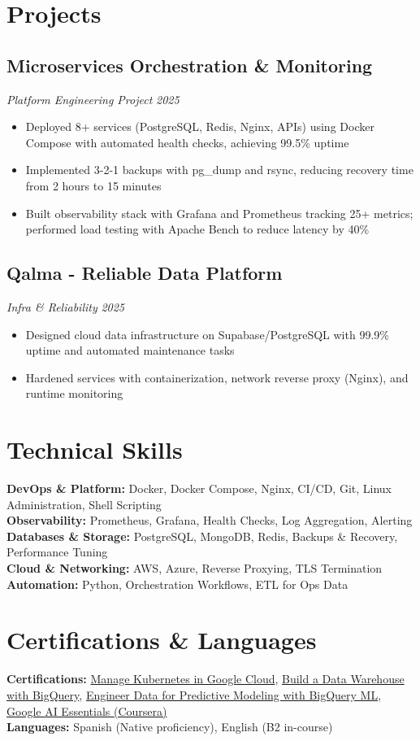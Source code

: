 \documentclass[7.5pt,a4paper]{article}
\newcommand{\project}[3]{\subsection*{#1}\textit{#2} \hfill \textit{#3}}
\begin{document}
\section*{Projects}

\project{Microservices Orchestration \& Monitoring}{Platform Engineering Project}{2025}
\begin{itemize}
\item Deployed 8+ services (PostgreSQL, Redis, Nginx, APIs) using Docker Compose with automated health checks, achieving 99.5\% uptime
\item Implemented 3-2-1 backups with pg\_dump and rsync, reducing recovery time from 2 hours to 15 minutes
\item Built observability stack with Grafana and Prometheus tracking 25+ metrics; performed load testing with Apache Bench to reduce latency by 40\%
\end{itemize}

\project{Qalma - Reliable Data Platform}{Infra \& Reliability}{2025}
\begin{itemize}
\item Designed cloud data infrastructure on Supabase/PostgreSQL with 99.9\% uptime and automated maintenance tasks
\item Hardened services with containerization, network reverse proxy (Nginx), and runtime monitoring
\end{itemize}

\section*{Technical Skills}
\textbf{DevOps \& Platform:} Docker, Docker Compose, Nginx, CI/CD, Git, Linux Administration, Shell Scripting \\
\textbf{Observability:} Prometheus, Grafana, Health Checks, Log Aggregation, Alerting \\
\textbf{Databases \& Storage:} PostgreSQL, MongoDB, Redis, Backups \& Recovery, Performance Tuning \\
\textbf{Cloud \& Networking:} AWS, Azure, Reverse Proxying, TLS Termination \\
\textbf{Automation:} Python, Orchestration Workflows, ETL for Ops Data

\section*{Certifications \& Languages}
\textbf{Certifications:} \href{https://www.credly.com/badges/5e7db262-4e11-41d3-8630-2b8c9c3458e3/public_url}{Manage Kubernetes in Google Cloud}, \href{https://www.credly.com/badges/c41430a1-de6e-4642-86e2-0d55dad94f18/public_url}{Build a Data Warehouse with BigQuery}, \href{https://www.credly.com/badges/18b87ad4-da02-4a37-a92e-f8e60fa53559/public_url}{Engineer Data for Predictive Modeling with BigQuery ML}, \href{https://www.credly.com/badges/1e3dfdbc-ec96-4e7c-a6e6-351eefae2390/public_url}{Google AI Essentials (Coursera)} \\
\textbf{Languages:} Spanish (Native proficiency), English (B2 in-course)
\end{document}
